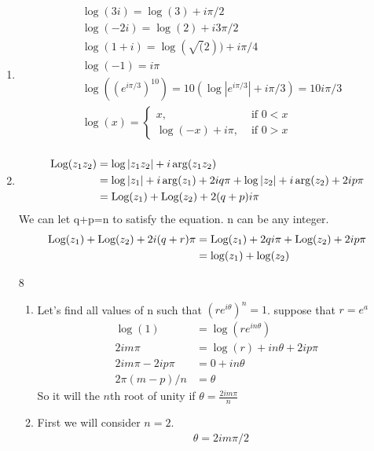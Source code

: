 \documentclass{article}
\begin{document}
\begin{enumerate}
\begin{enumerate}[label=(\roman*)]
      \end{enumerate}
    \item
      \begin{align*}
        &\log(3i)=\log(3)+i\pi/2\\
        &\log(-2i)=\log(2)+i3\pi/2\\
        &\log(1+i)=\log(\sqrt(2))+i\pi/4\\
        &\log(-1)=i\pi\\
        &\log((e^{i\pi/3})^{10})=10(\log|e^{i\pi/3}|+i\pi/3)=10i\pi/3\\
        &\log(x)=\begin{cases}
          x,&\text{ if }0<x\\
          \log(-x)+i\pi,&\text{ if }0>x
        \end{cases}\\
      \end{align*}
    \item
      \begin{align*}
        \text{Log}(z_1z_2)&=\log|z_1z_2|+i\arg(z_1z_2)\\
        &=\log|z_1|+i\arg(z_1)+2iq\pi+\log|z_2|+i\arg(z_2)+2ip\pi\\
        &=\text{Log}(z_1)+\text{Log}(z_2)+2(q+p)i\pi
      \end{align*}
      We can let q+p=n to satisfy the equation. n can be any integer.
      \begin{align*}
        \text{Log}(z_1)+\text{Log}(z_2)+2i(q+r)\pi&=\text{Log}(z_1)+2qi\pi+\text{Log}(z_2)+2ip\pi\\
        &=\log(z_1)+\log(z_2)
      \end{align*}
    \item[8]
      \begin{enumerate}[label=(\roman*)]
        \item
          Let's find all values of n such that $(re^{i\theta})^n=1$. suppose that $r=e^a$
          \begin{align*}
            \log(1)&=\log(re^{in\theta})\\
            2im\pi&=\log(r)+in\theta+2ip\pi\\
            2im\pi-2ip\pi&=0+in\theta\\
            2\pi(m-p)/n&=\theta
          \end{align*}
          So it will the $n$th root of unity if $\theta=\frac{2im\pi}{n}$
        \item
          First we will consider $n=2$.
          \begin{align*}
            &\theta=2im\pi/2\\

\end{align*}
\end{enumerate}
\end{enumerate}
\end{document}

